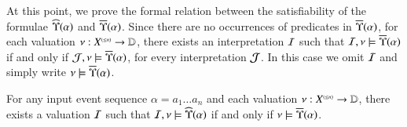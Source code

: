 At this point, we prove the formal relation between the satisfiability
of the formulae $\widehat{\Upsilon}({\alpha})$ and $\overline{\Upsilon}({\alpha})$. Since
there are no occurrences of predicates in $\overline{\Upsilon}({\alpha})$, for
each valuation $\nu : {X}^{\scriptscriptstyle{({\leq n})}} \rightarrow \mathbb{D}$, there
exists an interpretation $\mathcal{I}$ such that $\mathcal{I},\nu \models
\overline{\Upsilon}({\alpha})$ if and only if $\mathcal{J},\nu \models
\overline{\Upsilon}({\alpha})$, for every interpretation $\mathcal{J}$. In this case we
omit $\mathcal{I}$ and simply write $\nu \models \overline{\Upsilon}({\alpha})$.

\begin{lemma}\label{lemma:subst}
  For any input event sequence $\alpha=a_1\ldots a_n$ and each
  valuation $\nu : {X}^{\scriptscriptstyle{({\leq n})}} \rightarrow \mathbb{D}$, there exists
  a valuation $\mathcal{I}$ such that $\mathcal{I},\nu \models \widehat{\Upsilon}({\alpha})$ if
  and only if $\nu \models \overline{\Upsilon}({\alpha})$. 
\end{lemma}
